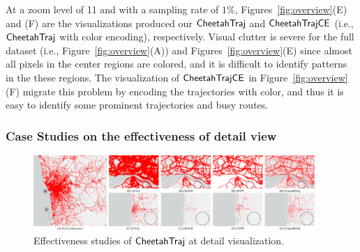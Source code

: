 
At a zoom level of 11 and with a sampling rate of $1\%$, Figures~\ref{fig:overview}(E) and (F) are the visualizations produced our $\mathsf{CheetahTraj}$ and $\mathsf{CheetahTraj}\mathsf{CE}$ (i.e., $\mathsf{CheetahTraj}$ with color encoding), respectively.
Visual clutter is severe for the full dataset (i.e., Figure~\ref{fig:overview}(A)) and Figures~\ref{fig:overview}(E) since almost all pixels in the center regions are colored, and it is difficult to identify patterns in the these regions. The visualization of $\mathsf{CheetahTraj}\mathsf{CE}$ in Figure~\ref{fig:overview}(F) migrate this problem by encoding the trajectories with color, and thus it is easy to identify some prominent trajectories and busy routes. 


\subsubsection{Case Studies on the effectiveness of detail view}\label{sec:detail}


\begin{figure}[t]
	\centering
	\includegraphics[width=0.95\textwidth]{pictures/case_study_icde/case_study_detail.pdf}
	\vspace{-3mm}
	\caption{Effectiveness studies of $\mathsf{CheetahTraj}$ at detail visualization.}
	\label{fig:detailview}
	\vspace{-2mm}
\end{figure}

